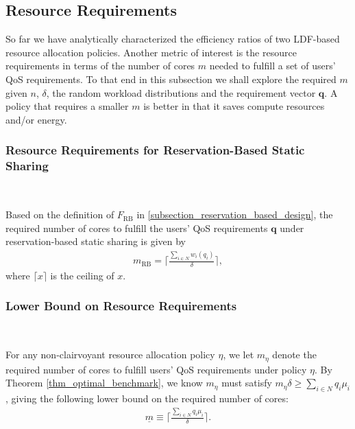 \documentclass[prodmode,acmtompecs]{acmsmall}
\newcommand{\reqvec}{\mathbf{q}}
\newcommand{\reqscalar}{q}
\newcommand{\fullUserSet}{N}
\newcommand{\myComments}[1]{}
\newif\ifdissertation
\newcommand{\dissertationStart}{\ifdissertation  \myComments{Dissertation version: }}
\newcommand{\commentEnd}{\myComments{End}}
\begin{document}
\dissertationStart
This heuristic LDF+TS/LLREF is still non-clairvoyant but picking appropriate $w_i^\text{est}$ is key to the performance. 
On one hand big $w_i^\text{est}$ reduces the number of tasks selected per period and on the other hand small $w_i^{\text{est}}$ may cause user $i$'s task fail to complete. 
In the simulation section, we will show such a policy performs well for NBUE workloads that are not deterministic but have small variability. 
\commentEnd\fi

\subsection{Resource Requirements}

So far we have analytically characterized the efficiency ratios of two LDF-based resource allocation policies. Another metric of interest is the resource requirements in terms of the number of cores $m$ needed to fulfill a set of users' QoS requirements. To that end in this subsection we shall explore the required $m$ given $n$, $\delta$, the random workload distributions and the requirement vector $\reqvec$. A policy that requires a smaller $m$ is better in that it saves compute resources and/or energy. 

\subsubsection{Resource Requirements for Reservation-Based Static Sharing}
~

Based on the definition of $F_{\text{RB}}$ in \ref{subsection_reservation_based_design}, the required number of cores to fulfill the users' QoS requirements $\reqvec$ under reservation-based static sharing is given by
\begin{align}
\label{align_m_RB}
m_{\text{RB}} = \Big\lceil \frac{\sum\limits_{i\in \fullUserSet}w_i(q_i)}{\delta} \Big\rceil, 
\end{align}
where $\lceil x \rceil$ is the ceiling of $x$. 

\subsubsection{Lower Bound on Resource Requirements}
~

For any non-clairvoyant resource allocation policy $\eta$, we let $m_{\eta}$ denote the required number of cores to fulfill users' QoS requirements under policy $\eta$. 
By Theorem \ref{thm_optimal_benchmark}, we know $m_{\eta}$ must satisfy 
$
m_{\eta} \delta \geq \sum\limits_{i\in \fullUserSet} \reqscalar_i \mu_i
$
, giving the following lower bound on the required number of cores: 
\begin{align}
\label{align_m_LB}
\underline{m} \equiv \Big\lceil \frac{\sum\limits_{i \in \fullUserSet} \reqscalar_i\mu_i}{\delta} \Big\rceil. 
\end{align}
\end{document}
